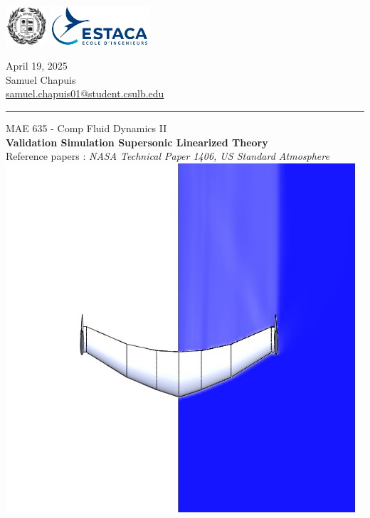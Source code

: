 \documentclass{article}
\begin{document}
\noindent
\begin{minipage}[t]{0.5\textwidth}
  \vspace{0pt}
  \includegraphics[height=1.5cm]{ressources/images/CSULB.png}\hspace{0.3cm}
  \includegraphics[height=1.5cm]{ressources/images/Estaca-Logo.png}
  \bigskip
\end{minipage}
\begin{minipage}[t]{0.5\textwidth}
  \vspace{8pt}
  \raggedleft
  April 19, 2025 \\
  Samuel Chapuis \\
  \href{mailto:samuel.chapuis01@student.csulb.edu}{samuel.chapuis01@student.csulb.edu} 
\end{minipage}




\rule{\linewidth}{1pt}

\begin{center}
	{\large MAE 635 - Comp Fluid Dynamics II} %
		\\[1.5cm]
		{\LARGE \textbf{Validation Simulation Supersonic Linearized Theory}} %
		\\[0.5cm]
		Reference papers : \textit{NASA Technical Paper 1406, US Standard Atmosphere}\\[2.5cm]

		\center 
		\includegraphics[height=13cm]{ressources/images/cover2.png}
\end{center}
\end{document}
